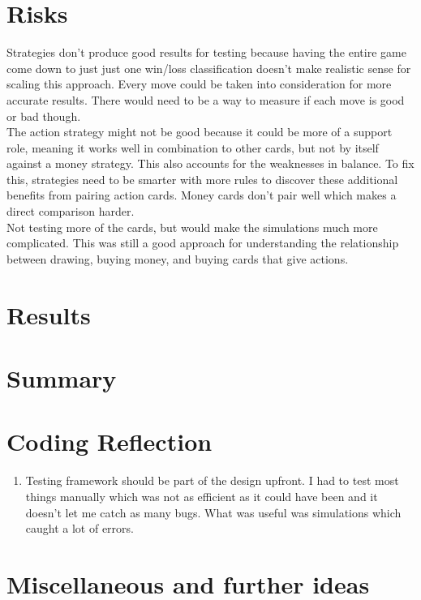 \documentclass[11pt, oneside]{article}   	%
\begin{document}
\section{Risks}

Strategies don't produce good results for testing because having the entire game come down to just just one win/loss classification doesn't make realistic sense for scaling this approach. Every move could be taken into consideration for more accurate results. There would need to be a way to measure if each move is good or bad though. 
\\
The action strategy might not be good because it could be more of a support role, meaning it works well in combination to other cards, but not by itself against a money strategy. This also accounts for the weaknesses in balance. To fix this, strategies need to be smarter with more rules to discover these additional benefits from pairing action cards. Money cards don't pair well which makes a direct comparison harder. 
\\
Not testing more of the cards, but would make the simulations much more complicated. This was still a good approach for understanding the relationship between drawing, buying money, and buying cards that give actions.

\section{Results}

\section{Summary}

\section{Coding Reflection}

	\begin{enumerate}
 		 \item Testing framework should be part of the design upfront. I had to test most things manually which was not as efficient as it could have been and it doesn't let me catch as many bugs. What was useful was simulations which caught a lot of errors. 
	\end{enumerate}



\section{Miscellaneous and further ideas}
\end{document}
